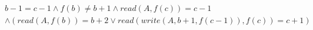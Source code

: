 \begin{align*}
%
& %
b - 1 = c - 1
%
\land
%
f(b)  \neq  b + 1
%
\land
%
\mathit{read}(A,f(c)) = c - 1
~\\~
& %
%
\land
%
(\mathit{read}(A,f(b)) = b + 2 \lor \mathit{read}(\mathit{write}(A,b + 1,f(c - 1)),f(c)) = c + 1)
%
\end{align*}
